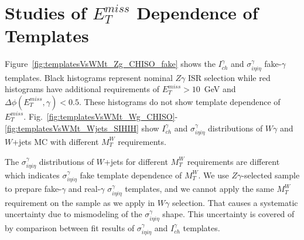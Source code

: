 \chapter{Studies of $E_T^{miss}$ Dependence of Templates}
\label{sec:CompareTemplatesPlots}

Figure~\ref{fig:templatesVsWMt_Zg_CHISO_fake} shows the $I_{ch}^{\gamma}$ and $\sigma_{i\eta i\eta}^{\gamma}$ fake-$\gamma$ templates. Black histograms represent nominal $Z\gamma$ ISR selection while red histograms have additional requirements of $E_T^{miss}>10$~GeV and $\Delta \phi(E_T^{miss},\gamma)<0.5$. These histograms do not show template dependence of $E_T^{miss}$. Fig.~\ref{fig:templatesVsWMt_Wg_CHISO}-\ref{fig:templatesVsWMt_Wjets_SIHIH} show $I_{ch}^\gamma$ and $\sigma_{i \eta i \eta}^{\gamma}$ distributions of $W\gamma$ and $W$+jets MC with different $M_T^W$ requirements. 

The $\sigma_{i \eta i \eta}^\gamma$ distributions of $W$+jets for different $M_T^W$ requirements are different which indicates $\sigma_{i \eta i\eta}^\gamma$ fake template dependence of $M_T^W$. We use $Z\gamma$-selected sample to prepare fake-$\gamma$ and real-$\gamma$ $\sigma_{i \eta i \eta}^\gamma$ templates, and we cannot apply the same $M_T^W$ requirement on the sample as we apply in $W\gamma$ selection. That causes a systematic uncertainty due to mismodeling of the $\sigma_{i \eta i \eta}^{\gamma}$ shape. This uncertainty is covered of by comparison between fit results of $\sigma_{i \eta i \eta}^{\gamma}$ and $I_{ch}^\gamma$ templates.

